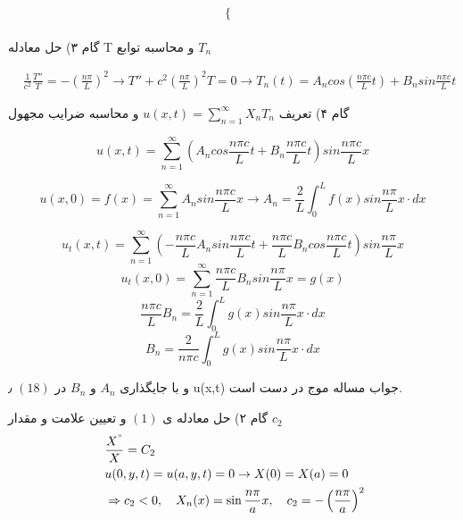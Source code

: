 \begin{problem}
\[\begin{cases}
\end{cases}
\]
\\

گام ۳)
حل معادله T
و محاسبه توابع 
$T_n$

\begin{align*}
&\frac{1}{c^2} \frac{T''}{T} = -(\frac{n \pi}{L})^2
\rightarrow
T'' +  c^2({\frac{n \pi}{L}})^2	T = 0
 \rightarrow
T_n(t) = A_n cos (\frac{n \pi c}{L} t) + B_n sin \frac{n \pi c}{L} t
\end{align*}

گام ۴)
تعریف 
$u(x,t) = \sum_{n=1}^\infty X_n T_n$
و محاسبه ضرایب مجهول

\begin{equation}
	u(x,t) = \sum_{n=1}^\infty 
	(A_n cos \frac {n\pi c}{L}t + B_n \frac {n\pi c}{L}t) sin \frac {n\pi c}{L}x
	\label{eq:5}
\end{equation}

\begin{equation}
	u(x,0) = f(x) =‎‎\sum_{n=1}^{\infty}
	A_n sin \frac {n\pi c}{L}x
	\rightarrow A_n = \frac{2}{L} 
	\int_0^L f(x) sin \frac {n\pi}{L}x \cdot dx
\end{equation}

\begin{equation}
	u_t(x,t) = \sum_{n=1}^{\infty}
	( -\frac{n\pi c }{L} A_n sin \frac {n \pi c}{L}t + \frac {n \pi c}{L} B_n cos \frac {n \pi c}{L}t) sin \frac {n \pi }{L}x
\end{equation}
\begin{equation}
	u_t(x,0) = \sum_{n=1}^{\infty} \frac {n \pi c}{L}B_n sin\frac {n \pi}{L}x = g(x)
\end{equation}
\begin{equation}
	\frac {n \pi c}{L} B_n = \frac{2}{L} \int_0^L g(x) sin \frac {n \pi}{L}x \cdot dx
\end{equation}
\begin{equation}
	B_n = \frac{2}{n\pi c} \int_0^L g(x) sin \frac{n\pi}{L} x \cdot dx
\end{equation}

و با جایگذاری 
$A_n$
و
 $B_n$
 در 
 $(18)$
 ٫ 
 u(x,t)
 جواب مساله موج در دست است.

\end{problem}
گام ۲) حل معادله ی
$(1)$
و تعیین علامت و مقدار 
$c_2$
\begin{equation*}
	\begin{aligned}
		{} &\
		\frac {X^"}{X}=C_2
		\\ &\
		u(0,y,t)=u(a,y,t)=0 \rightarrow X(0)=X(a)=0
		\\ &\
		\Rightarrow c_{2}<0 ,\quad X_{n}(x) = \sin \frac{n \pi}{a} x ,\quad c_{2}=-\left(\frac{n\pi}{a}\right)^{2}
	\end{aligned}
\end{equation*}
